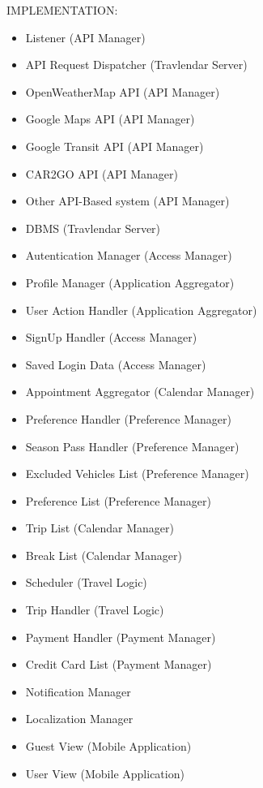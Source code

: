 \documentclass[12pt, a4paper]{article}
\begin{document}
IMPLEMENTATION:

\begin{itemize}
	\item	 Listener								(API Manager)
	\item API Request Dispatcher		(Travlendar Server)
	\item	 OpenWeatherMap API 			(API Manager)
	\item Google Maps API					(API Manager)
	\item Google Transit API				(API Manager)
	\item CAR2GO API							(API Manager)
	\item Other API-Based system		(API Manager)
	\item DBMS									(Travlendar Server)
	\item Autentication Manager          (Access Manager)
	\item Profile Manager					(Application Aggregator)
	\item User Action Handler				(Application Aggregator)
	\item SignUp Handler 					(Access Manager)
	\item Saved Login Data   				(Access Manager)
	\item Appointment Aggregator		(Calendar Manager)
	\item Preference Handler				(Preference Manager)
	\item Season Pass Handler			(Preference Manager)
	\item Excluded Vehicles List			(Preference Manager)
	\item Preference List						(Preference Manager)
	\item Trip List								(Calendar Manager)
	\item Break List								(Calendar Manager)
	\item Scheduler 							(Travel Logic)
	\item Trip Handler							(Travel Logic)
	\item Payment Handler					(Payment Manager)
	\item Credit Card List					(Payment Manager)
	\item Notification Manager
	\item Localization Manager
	\item Guest View 							(Mobile Application)
	\item User View								(Mobile Application)


\end{itemize}
\end{document}
